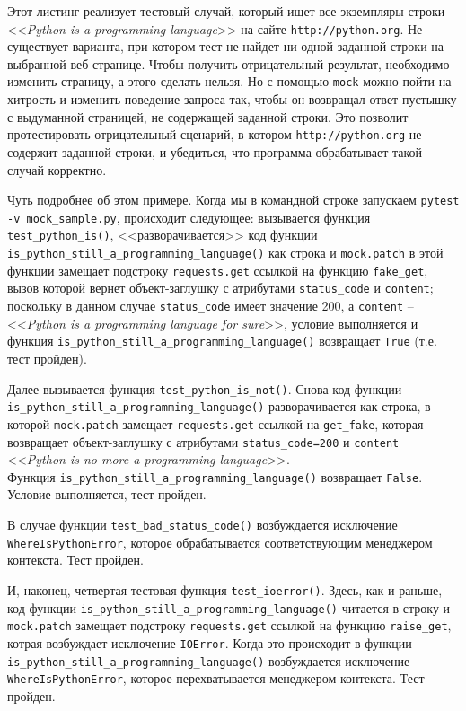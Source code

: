 \documentclass[%
	11pt,
	a4paper,
	utf8,
		]{article}
\begin{document}
Этот листинг реализует тестовый случай, который ищет все экземпляры строки <<\emph{Python is a programming language}>> на сайте \texttt{http://python.org}. Не существует варианта, при котором тест не найдет ни одной заданной строки на выбранной веб-странице. Чтобы получить отрицательный результат, необходимо изменить страницу, а этого сделать нельзя. Но с помощью \texttt{mock} можно пойти на хитрость и изменить поведение запроса так, чтобы он возвращал ответ-пустышку с выдуманной страницей, не содержащей заданной строки. Это позволит протестировать отрицательный сценарий, в котором \texttt{http://python.org} не содержит заданной строки, и убедиться, что программа обрабатывает такой случай корректно.

Чуть подробнее об этом примере. Когда мы в командной строке запускаем \texttt{pytest -v mock\_sample.py}, происходит следующее: вызывается функция \texttt{test\_python\_is()}, <<разворачивается>> код функции \\ \texttt{is\_python\_still\_a\_programming\_language()} как строка и \texttt{mock.patch} в этой функции замещает подстроку \texttt{requests.get} ссылкой на функцию \texttt{fake\_get}, вызов которой вернет объект-заглушку с атрибутами \texttt{status\_code} и \texttt{content}; поскольку в данном случае \texttt{status\_code} имеет значение 200, а \texttt{content} -- <<\emph{Python is a programming language for sure}>>, условие выполняется и функция \texttt{is\_python\_still\_a\_programming\_language()} возвращает \texttt{True} (т.е. тест пройден).


Далее вызывается функция \texttt{test\_python\_is\_not()}. Снова код функции\\ \texttt{is\_python\_still\_a\_programming\_language()} разворачивается как строка, в которой \texttt{mock.patch} замещает \texttt{requests.get} ссылкой на \texttt{get\_fake}, которая возвращает объект-заглушку с атрибутами \texttt{status\_code=200} и \texttt{content} <<\emph{Python is no more a programming language}>>.\\ Функция \texttt{is\_python\_still\_a\_programming\_language()} возвращает \texttt{False}. Условие выполняется, тест пройден.

В случае функции \texttt{test\_bad\_status\_code()} возбуждается исключение \texttt{WhereIsPythonError}, которое обрабатывается соответствующим менеджером контекста. Тест пройден.

И, наконец, четвертая тестовая функция \texttt{test\_ioerror()}. Здесь, как и раньше, код функции \texttt{is\_python\_still\_a\_programming\_language()} читается в строку и \texttt{mock.patch} замещает подстроку \texttt{requests.get} ссылкой на функцию \texttt{raise\_get}, котрая возбуждает исключение \texttt{IOError}. Когда это происходит в функции \texttt{is\_python\_still\_a\_programming\_language()} возбуждается исключение \texttt{WhereIsPythonError}, которое перехватывается менеджером контекста. Тест пройден.
\end{document}

